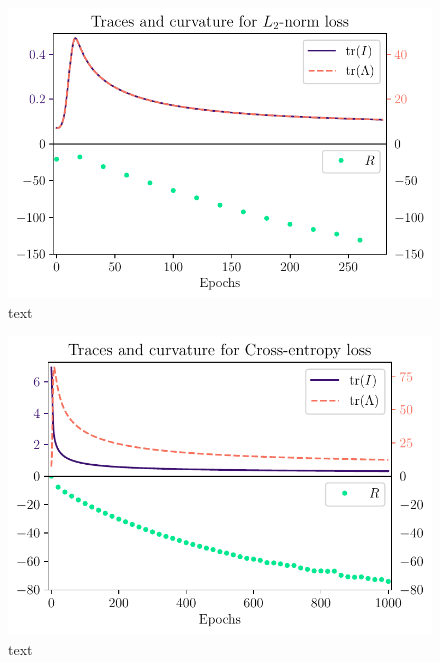 \begin{figure}
	\centering
	\includegraphics{Experiment2/plots/LPNormLoss2_Curves.pdf}
	\caption{text}
\end{figure}

\begin{figure}
	\centering
	\includegraphics{Experiment2/plots/CrossEntropyLoss_Curves.pdf}
	\caption{text}
\end{figure}